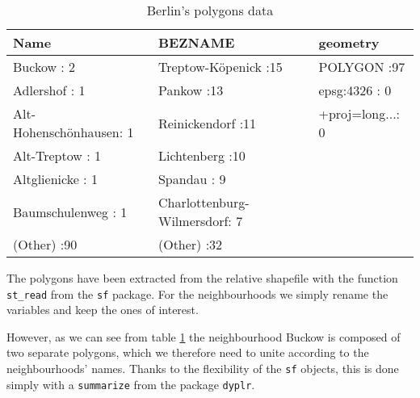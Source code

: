 \begin{table}[H]
\centering
\begin{tabular}{lll}
  \hline \hline
                  Name &                       BEZNAME &          geometry \\ 
  \hline
Buckow              : 2   & Treptow-Köpenick          :15   & POLYGON      :97   \\ 
  Adlershof           : 1   & Pankow                    :13   & epsg:4326    : 0   \\ 
  Alt-Hohenschönhausen: 1   & Reinickendorf             :11   & +proj=long...: 0   \\ 
  Alt-Treptow         : 1   & Lichtenberg               :10   &  \\ 
  Altglienicke        : 1   & Spandau                   : 9   &  \\ 
  Baumschulenweg      : 1   & Charlottenburg-Wilmersdorf: 7   &  \\ 
  (Other)             :90   & (Other)                   :32   &  \\ 
   \hline \hline
\end{tabular}
\caption{Berlin's polygons data}
\label{table:neighbourhoods}
\end{table}

The polygons have been extracted from the relative shapefile with the function \texttt{st\_read} from the \texttt{sf} package. For the neighbourhoods we simply rename the variables and keep the ones of interest.



However, as we can see from table \ref{table:neighbourhoods} the neighbourhood Buckow is composed of two separate polygons, which we therefore need to unite according to the neighbourhoods' names. Thanks to the flexibility of the \texttt{sf} objects, this is done simply with a \texttt{summarize} from the package \texttt{dyplr}.




